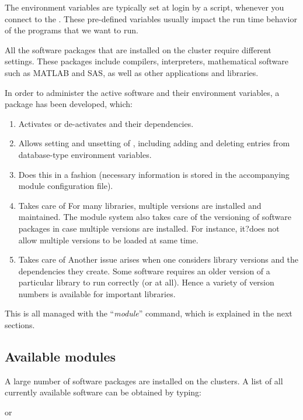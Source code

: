 The environment variables are typically set at login by a script, whenever you
connect to the \hpc. These pre-defined variables usually impact the run time
behavior of the programs that we want to run.

All the software packages that are installed on the \hpc cluster require
different settings. These packages include compilers, interpreters,
mathematical software such as MATLAB and SAS, as well as other applications and
libraries.

In order to administer the active software and their environment variables, a
 package has been developed, which:

\begin{enumerate}
\item  Activates or de-activates  and their dependencies.
\item  Allows setting and unsetting of , including adding and deleting entries from database-type environment variables.
\item  Does this in a  fashion (necessary information is stored in the accompanying module configuration file).
\item  Takes care of  For many libraries, multiple versions are installed and maintained. The module system also takes care of the versioning of software packages in case multiple versions are installed. For instance, it?does not allow multiple versions to be loaded at same time.
\item  Takes care of  Another issue arises when one considers library versions and the dependencies they create. Some software requires an older version of a particular library to run correctly (or at all). Hence a variety of version numbers is available for important libraries.
\end{enumerate}

This is all managed with the ``\emph{module}'' command, which is explained in the next sections.

\subsection{Available modules}

A large number of software packages are installed on the \hpc clusters. A
list of all currently available software can be obtained by typing:

\begin{prompt}
\end{prompt}
or
\begin{prompt}
\end{prompt}


